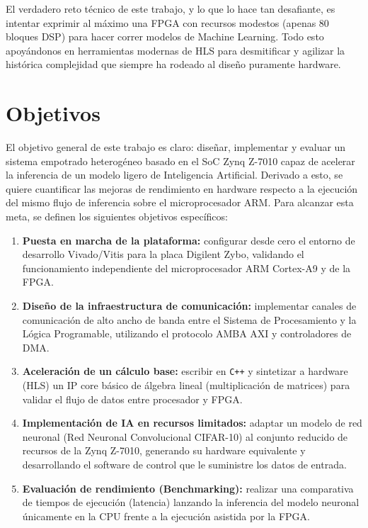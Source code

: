 El verdadero reto técnico de este trabajo, y lo que lo hace tan desafiante, es intentar
exprimir al máximo una \ac{FPGA} con recursos modestos (apenas 80 bloques \ac{DSP}) para hacer
correr modelos de Machine Learning. Todo esto apoyándonos en herramientas modernas de
\ac{HLS} para desmitificar y agilizar la histórica complejidad que
siempre ha rodeado al diseño puramente hardware.

\section{Objetivos}
El objetivo general de este trabajo es claro: diseñar, implementar y evaluar un sistema
empotrado heterogéneo basado en el \ac{SoC} Zynq Z-7010 capaz de acelerar la inferencia de un
modelo ligero de Inteligencia Artificial.
Derivado a esto, se quiere cuantificar las mejoras de rendimiento en hardware respecto a
la ejecución del mismo flujo de inferencia sobre el microprocesador \ac{ARM}.
Para alcanzar esta meta, se definen los siguientes objetivos específicos:

\begin{enumerate}
  \item \textbf{Puesta en marcha de la plataforma:} configurar desde cero el entorno de
    desarrollo Vivado/Vitis para la placa Digilent Zybo, validando el funcionamiento
    independiente del microprocesador \ac{ARM} Cortex-A9 y de la \ac{FPGA}.
  \item \textbf{Diseño de la infraestructura de comunicación:} implementar canales de
    comunicación de alto ancho de banda entre el Sistema de Procesamiento y la Lógica
    Programable, utilizando el protocolo \ac{AMBA} \ac{AXI} y controladores de \ac{DMA}.
  \item \textbf{Aceleración de un cálculo base:} escribir en \texttt{C++} y sintetizar a hardware
    (\ac{HLS}) un \ac{IP} core básico de álgebra lineal (multiplicación de matrices) para validar
    el flujo de datos entre procesador y \ac{FPGA}.
  \item \textbf{Implementación de \ac{IA} en recursos limitados:} adaptar un modelo de red
    neuronal (Red Neuronal Convolucional \ac{CIFAR}-10) al conjunto reducido de recursos de la
    Zynq Z-7010, generando su hardware equivalente y desarrollando el software de control
    que le suministre los datos de entrada.
  \item \textbf{Evaluación de rendimiento (Benchmarking):} realizar una comparativa de
    tiempos de ejecución (latencia) lanzando la inferencia del modelo neuronal únicamente
    en la \ac{CPU} frente a la ejecución asistida por la \ac{FPGA}.
\end{enumerate}

